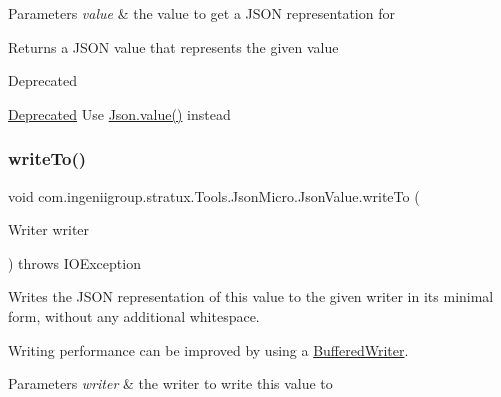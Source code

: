 \begin{DoxyParams}{Parameters}
{\em value} & the value to get a J\+S\+ON representation for \\
\hline
\end{DoxyParams}
\begin{DoxyReturn}{Returns}
a J\+S\+ON value that represents the given value 
\end{DoxyReturn}
\begin{DoxyRefDesc}{Deprecated}
\item[\hyperlink{deprecated__deprecated000015}{Deprecated}]Use {\ttfamily \hyperlink{classcom_1_1ingeniigroup_1_1stratux_1_1_tools_1_1_json_micro_1_1_json_aa7a17dbf2bbb667284cb5a86d404bf6d}{Json.\+value()}} instead \end{DoxyRefDesc}
\mbox{\label{classcom_1_1ingeniigroup_1_1stratux_1_1_tools_1_1_json_micro_1_1_json_value_a41c84cc48d6f44b0c75130f3a1476704}} 
\subsubsection{\texorpdfstring{write\+To()}{writeTo()}\hspace{0.1cm}{\footnotesize\ttfamily [1/2]}}
{\footnotesize\ttfamily void com.\+ingeniigroup.\+stratux.\+Tools.\+Json\+Micro.\+Json\+Value.\+write\+To (\begin{DoxyParamCaption}\item[{Writer}]{writer }\end{DoxyParamCaption}) throws I\+O\+Exception}

Writes the J\+S\+ON representation of this value to the given writer in its minimal form, without any additional whitespace. 

Writing performance can be improved by using a \hyperlink{}{Buffered\+Writer}. 


\begin{DoxyParams}{Parameters}
{\em writer} & the writer to write this value to \\
\hline
\end{DoxyParams}

